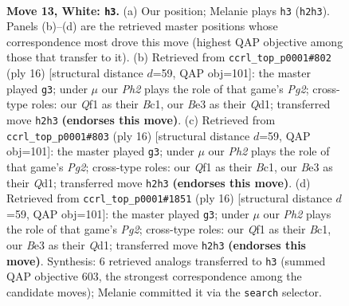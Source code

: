 \documentclass[11pt]{article}
\begin{document}
\begin{figure}[p]
\label{fig:thought-m22}
\end{figure}

\clearpage

\begin{figure}[p]\centering
\begin{subfigure}{0.46\textwidth}\centering
\resizebox{\linewidth}{!}{%
\newchessgame
\chessboard[
  setfen={rn1qkbr1/5p2/3p1np1/2pPp3/4P1p1/2N1B3/PP1K1P1P/R4QNR w q - 1 13},
  showmover=false,
  pgfstyle=straightmove, color=movearrow, markmove={h2-h3}
]}
\caption{}
\end{subfigure}\hfill
\begin{subfigure}{0.46\textwidth}\centering
\resizebox{\linewidth}{!}{%
\newchessgame
\chessboard[
  setfen={rn1qkb1r/4pp1p/3p1np1/2pP4/4P3/2N5/PP3PPP/R1BQ1KNR w kq - 0 9},
  showmover=false,
  pgfstyle=straightmove, color=movearrow, markmove={g2-g3}
]}
\caption{}
\end{subfigure}
\\[4pt]
\begin{subfigure}{0.46\textwidth}\centering
\resizebox{\linewidth}{!}{%
\newchessgame
\chessboard[
  setfen={rn1qkb1r/4pp1p/3p1np1/2pP4/4P3/2N5/PP3PPP/R1BQ1KNR w kq - 0 9},
  showmover=false,
  pgfstyle=straightmove, color=movearrow, markmove={g2-g3}
]}
\caption{}
\end{subfigure}\hfill
\begin{subfigure}{0.46\textwidth}\centering
\resizebox{\linewidth}{!}{%
\newchessgame
\chessboard[
  setfen={rn1qkb1r/4pp1p/3p1np1/2pP4/4P3/2N5/PP3PPP/R1BQ1KNR w kq - 0 9},
  showmover=false,
  pgfstyle=straightmove, color=movearrow, markmove={g2-g3}
]}
\caption{}
\end{subfigure}
\caption{\textbf{Move 13, White: \texttt{h3}.} (a) Our position; Melanie plays \texttt{h3} (\texttt{h2h3}). Panels (b)--(d) are the retrieved master positions whose correspondence most drove this move (highest QAP objective among those that transfer to it). (b) Retrieved from \texttt{ccrl\_top\_p0001\#802} (ply 16) [structural distance $d$=59, QAP obj=101]: the master played \texttt{g3}; under $\mu$ our \emph{Ph2} plays the role of that game's \emph{Pg2}; cross-type roles: our \emph{Q}f1 as their \emph{B}c1, our \emph{B}e3 as their \emph{Q}d1; transferred move \texttt{h2h3} \textbf{(endorses this move)}. (c) Retrieved from \texttt{ccrl\_top\_p0001\#803} (ply 16) [structural distance $d$=59, QAP obj=101]: the master played \texttt{g3}; under $\mu$ our \emph{Ph2} plays the role of that game's \emph{Pg2}; cross-type roles: our \emph{Q}f1 as their \emph{B}c1, our \emph{B}e3 as their \emph{Q}d1; transferred move \texttt{h2h3} \textbf{(endorses this move)}. (d) Retrieved from \texttt{ccrl\_top\_p0001\#1851} (ply 16) [structural distance $d$=59, QAP obj=101]: the master played \texttt{g3}; under $\mu$ our \emph{Ph2} plays the role of that game's \emph{Pg2}; cross-type roles: our \emph{Q}f1 as their \emph{B}c1, our \emph{B}e3 as their \emph{Q}d1; transferred move \texttt{h2h3} \textbf{(endorses this move)}. Synthesis: 6 retrieved analogs transferred to \texttt{h3} (summed QAP objective 603, the strongest correspondence among the candidate moves); Melanie committed it via the \texttt{search} selector.}
\label{fig:thought-m24}
\end{figure}
\end{document}
